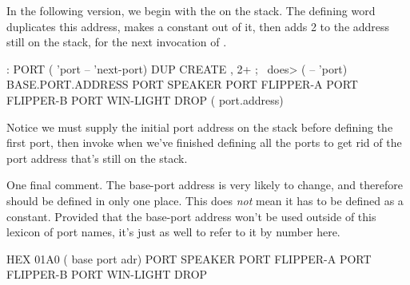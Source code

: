 In the following version, we begin with the 
on the stack. The defining word  duplicates this address,
makes a constant out of it, then adds 2 to the address still on the
stack, for the next invocation of .

\begin{Code}
: PORT   ( 'port -- 'next-port)  DUP CREATE ,  2+ ;
   \ does>  ( -- 'port)
BASE.PORT.ADDRESS
  PORT SPEAKER
  PORT FLIPPER-A
  PORT FLIPPER-B
  PORT WIN-LIGHT
DROP ( port.address)
\end{Code}
Notice we must supply the initial port address on the stack before
defining the first port, then invoke  when we've finished
defining all the ports to get rid of the port address that's still on
the stack.

One final comment. The base-port address is very likely to change, and
therefore should be defined in only one place. This does \emph{not}
mean it has to be defined as a constant. Provided that the base-port
address won't be used outside of this lexicon of port names, it's just
as well to refer to it by number here.

\begin{Code}
HEX 01A0  ( base port adr)
  PORT SPEAKER
  PORT FLIPPER-A
  PORT FLIPPER-B
  PORT WIN-LIGHT
DROP
\end{Code}

